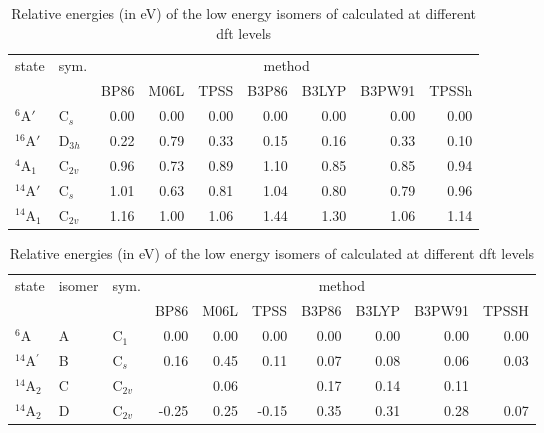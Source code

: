 \begin{refsection}
\begin{table}[h]
	\centering
	\caption{Relative energies (in eV) of the low energy isomers of  calculated at different \acrshort{dft} levels}
	\label{a7tbl:Cr3O}
	\begin{tabular}{llrrrrrrr}
		\hline
		\multirow{2}{*}{state} & \multirow{2}{*}{sym.}  & \multicolumn{7}{c}{method}                                  \\ \cline{3-9} 
						 &            & BP86   & M06L  & TPSS  & B3P86   & B3LYP  & B3PW91   & TPSSh       	\\ \hline
        $^6$A$'$         & C$_s$      & 0.00   & 0.00  & 0.00  & 0.00    & 0.00   & 0.00     & 0.00  		\\
        $^{16}$A$'$      & D$_{3h}$   & 0.22   & 0.79  & 0.33  & 0.15    & 0.16   & 0.33     & 0.10  		\\
        $^4$A$_1$        & C$_{2v}$   & 0.96   & 0.73  & 0.89  & 1.10    & 0.85   & 0.85     & 0.94  		\\
        $^{14}$A$'$      & C$_s$      & 1.01   & 0.63  & 0.81  & 1.04    & 0.80   & 0.79     & 0.96  		\\
        $^{14}$A$_1$     & C$_{2v}$   & 1.16   & 1.00  & 1.06  & 1.44    & 1.30   & 1.06     & 1.14  		\\ \hline
	\end{tabular}
\end{table}


\begin{table}[h]
    \centering
    \small
	\label{a7tbl:Cr3O2}
	\caption{Relative energies (in eV) of the low energy isomers of  calculated at different \acrshort{dft} levels}
	\begin{tabular}{lllrrrrrrr}
		\hline
		\multirow{2}{*}{state} & \multirow{2}{*}{isomer} & \multirow{2}{*}{sym.} & \multicolumn{7}{c}{method}   \\ \cline{4-10} 
							   &      &           & BP86  & M06L & TPSS   & B3P86 & B3LYP  & B3PW91 & TPSSH \\ \hline
        $^6 $A                 & A    & C$_1$     & 0.00  & 0.00 & 0.00   & 0.00  & 0.00   & 0.00   & 0.00  \\
        $^{14}$A$^\prime$      & B    & C$_s$     & 0.16  & 0.45 & 0.11   & 0.07  & 0.08   & 0.06   & 0.03  \\
        $^{14}$A$_2$           & C    & C$_{2v}$  &       & 0.06 &        & 0.17  & 0.14   & 0.11   &       \\
        $^{14}$A$_2$           & D    & C$_{2v}$  & -0.25 & 0.25 & -0.15  & 0.35  & 0.31   & 0.28   & 0.07  \\ \hline
	\end{tabular}
\end{table}



\end{refsection}
